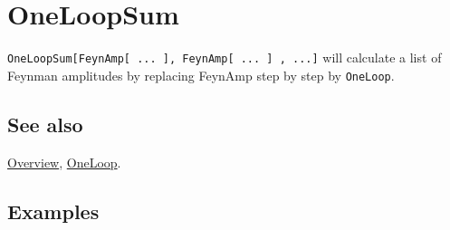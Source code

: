 \documentclass[../FeynCalcManual.tex]{subfiles}
\begin{document}
\hypertarget{oneloopsum}{
\section{OneLoopSum}\label{oneloopsum}}

\texttt{OneLoopSum[\allowbreak{}FeynAmp[\allowbreak{} ... ],\ \allowbreak{}FeynAmp[\allowbreak{} ... ] ,\ \allowbreak{}...]}
will calculate a list of Feynman amplitudes by replacing FeynAmp step by
step by \texttt{OneLoop}.

\subsection{See also}

\hyperlink{toc}{Overview}, \hyperlink{oneloop}{OneLoop}.

\subsection{Examples}
\end{document}
